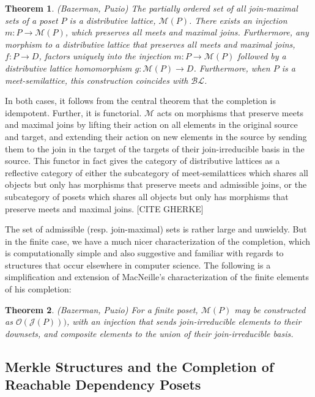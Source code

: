 \documentclass[hoptionsi,review,format=acmsmall]{acmart}
\newtheorem{theorem}{Theorem}[section]
\theoremstyle{definition}
\newcommand{\Mcc}{\mathcal{M}}
\newcommand{\Oc}{\mathcal{O}}
\newcommand{\Jc}{\mathcal{J}}
\newcommand{\BLc}{\mathcal{BL}}
\begin{document}
\begin{theorem}
(Bazerman, Puzio) The partially ordered set of all join-maximal sets of a poset \(P\) is a distributive lattice, \(\Mcc(P)\). There exists an injection \(m : P \rightarrow \Mcc(P)\), which preserves all meets and maximal joins. Furthermore, any morphism to a distributive lattice that preserves all meets and maximal joins, \(f : P \rightarrow D\), factors uniquely into the injection \(m : P \rightarrow \Mcc(P)\) followed by a distributive lattice homomorphism \(g : \Mcc(P) \rightarrow D\). Furthermore, when \(P\) is a meet-semilattice, this construction coincides with \(\BLc\).
\end{theorem}

In both cases, it follows from the central theorem that the completion is idempotent. Further, it is functorial. \(\Mcc\) acts on morphisms that preserve meets and maximal joins by lifting their action on all elements in the original source and target, and extending their action on new elements in the source by sending them to the join in the target of the targets of their join-irreducible basis in the source. This functor in fact gives the category of distributive lattices as a reflective category of either the subcategory of meet-semilattices which shares all objects but only has morphisms that preserve meets and admissible joins, or the subcategory of posets which shares all objects but only has morphisms that preserve meets and maximal joins. [CITE GHERKE]

The set of admissible (resp. join-maximal) sets is rather large and unwieldy. But in the finite case, we have a much nicer characterization of the completion, which is computationally simple and also suggestive and familiar with regards to structures that occur elsewhere in computer science. The following is a simplification and extension of MacNeille's characterization of the finite elements of his completion:

\begin{theorem}
(Bazerman, Puzio) For a finite poset, \(\Mcc(P)\) may be constructed as \(\Oc(\Jc(P)))\), with an injection that sends join-irreducible elements to their downsets, and composite elements to the union of their join-irreducible basis.
\end{theorem}

\subsection{Merkle Structures and the Completion of Reachable Dependency Posets}
\end{document}
